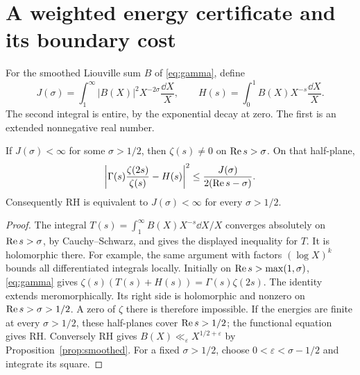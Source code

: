\section{A weighted energy certificate and its boundary cost}
\label{sec:weighted-certificate}

For the smoothed Liouville sum \(B\) of \eqref{eq:gamma}, define
\[
 J(\sigma)=\int_1^\infty |B(X)|^2X^{-2\sigma}\frac{\dd X}{X},
 \qquad
 H(s)=\int_0^1 B(X)X^{-s}\frac{\dd X}{X}.
\]
The second integral is entire, by the exponential decay at zero.
The first is an extended nonnegative real number.

\begin{theorem}
\label{thm:weighted-certificate}
If \(J(\sigma)<\infty\) for some \(\sigma>1/2\), then
\(\zeta(s)\ne0\) on \(\operatorname{Re} s>\sigma\). On that half-plane,
\[
 \left|\Gamma(s)\frac{\zeta(2s)}{\zeta(s)}-H(s)\right|^2
 \le\frac{J(\sigma)}{2(\operatorname{Re} s-\sigma)}.
\]
Consequently RH is equivalent to \(J(\sigma)<\infty\) for every
\(\sigma>1/2\).
\end{theorem}
\begin{proof}
The integral \(T(s)=\int_1^\infty B(X)X^{-s}\dd X/X\)
converges absolutely on \(\operatorname{Re} s>\sigma\), by Cauchy--Schwarz,
and gives the displayed inequality for \(T\). It is holomorphic
there. For example, the same argument with factors
\((\log X)^k\) bounds all differentiated integrals locally.
Initially on \(\operatorname{Re} s>\max(1,\sigma)\), \eqref{eq:gamma} gives
\(\zeta(s)(T(s)+H(s))=\Gamma(s)\zeta(2s)\).
The identity extends meromorphically. Its right side is
holomorphic and nonzero on \(\operatorname{Re} s>\sigma>1/2\).
A zero of \(\zeta\) there is therefore impossible.
If the energies are finite at every \(\sigma>1/2\), these
half-planes cover \(\operatorname{Re} s>1/2\); the functional equation gives RH.
Conversely RH gives \(B(X)\ll_\varepsilon X^{1/2+\varepsilon}\)
by Proposition~\ref{prop:smoothed}. For a fixed \(\sigma>1/2\),
choose \(0<\varepsilon<\sigma-1/2\) and integrate its square.
\end{proof}

